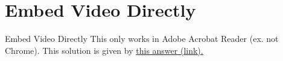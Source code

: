 \documentclass[compress]{beamer}
\begin{document}
\section{Embed Video Directly}
\begin{frame}{Embed Video Directly}
    This only works in Adobe Acrobat Reader (ex. not Chrome).
    This solution is given by \href{https://tex.stackexchange.com/questions/516029/media9-is-becoming-obsolete-dec-2020-any-alternatives-for-embedding-video-audio}{this answer (link).}
\end{frame}
\end{document}
